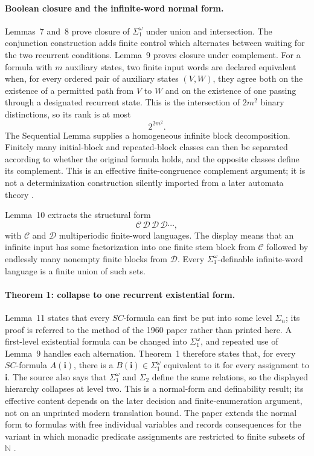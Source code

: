 \paragraph{Boolean closure and the infinite-word normal form.}
Lemmas~7 and~8 prove closure of \(\Sigma_1^\omega\) under union and
intersection.  The conjunction construction adds finite control which
alternates between waiting for the two recurrent conditions.  Lemma~9 proves
closure under complement.  For a formula with \(m\) auxiliary states, two
finite input words are declared equivalent when, for every ordered pair of
auxiliary states \((V,W)\), they agree both on the existence of a permitted
path from \(V\) to \(W\) and on the existence of one passing through a
designated recurrent state.  This is the intersection of \(2m^2\) binary
distinctions, so its rank is at most
\[
 2^{2m^2}.
\]
The Sequential Lemma supplies a homogeneous infinite block decomposition.
Finitely many initial-block and repeated-block classes can then be separated
according to whether the original formula holds, and the opposite classes
define its complement.  This is an effective finite-congruence complement
argument; it is not a determinization construction silently imported from a
later automata theory \cite[pp.~5--7]{Buchi1962}.

Lemma~10 extracts the structural form
\[
 \mathcal C\,\mathcal D\,\mathcal D\,\mathcal D\cdots,
\]
with \(\mathcal C\) and \(\mathcal D\) multiperiodic finite-word languages.
The display means that an infinite input has some factorization into one
finite stem block from \(\mathcal C\) followed by endlessly many nonempty
finite blocks from \(\mathcal D\).  Every \(\Sigma_1^\omega\)-definable infinite-word
language is a finite union of such sets.

\paragraph{Theorem 1: collapse to one recurrent existential form.}
Lemma~11 states that every \(SC\)-formula can first be put into some level
\(\Sigma_n\); its proof is referred to the method of the 1960 paper rather
than printed here.  A first-level existential formula can be changed into
\(\Sigma_1^\omega\), and repeated use of Lemma~9 handles each alternation.
Theorem~1 therefore states that, for every \(SC\)-formula
\(A(\mathbf i)\), there is a \(B(\mathbf i)\in\Sigma_1^\omega\) equivalent to
it for every assignment to \(\mathbf i\).
The source also says that \(\Sigma_1^\omega\) and \(\Sigma_2\) define the same
relations, so the displayed hierarchy collapses at level two.  This is a
normal-form and definability result; its effective content depends on the
later decision and finite-enumeration argument, not on an unprinted modern
translation bound.  The paper extends the normal form to formulas with free
individual variables and records consequences for the variant in which monadic
predicate assignments are restricted to finite subsets of \(\mathbb N\)
\cite[p.~7]{Buchi1962}.

